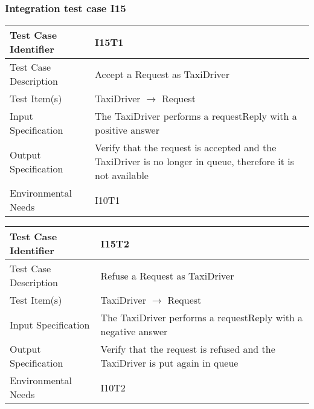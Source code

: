 		\subsubsection{Integration test case I15}
		\begin{center}
			\begin{tabular}{ |l p{10cm}| } \hline
				Test Case Identifier & I15T1 \\ \hline
				Test Case Description & Accept a Request as TaxiDriver \\ \hline
				Test Item(s) & TaxiDriver $\rightarrow$ Request \\ \hline
				Input Specification & The TaxiDriver performs a requestReply with a positive answer  \\ \hline
				Output Specification & Verify that the request is accepted and the TaxiDriver is no longer in queue, therefore it is not available \\ \hline
				Environmental Needs & I10T1 \\ \hline
			\end{tabular}
			\begin{tabular}{ |l p{10cm}| } \hline
				Test Case Identifier & I15T2 \\ \hline
				Test Case Description & Refuse a Request as TaxiDriver \\ \hline
				Test Item(s) & TaxiDriver $\rightarrow$ Request \\ \hline
				Input Specification & The TaxiDriver performs a requestReply with a negative answer \\ \hline
				Output Specification & Verify that the request is refused and the TaxiDriver is put again in queue \\ \hline
				Environmental Needs & I10T2 \\ \hline
			\end{tabular}
		\end{center}
